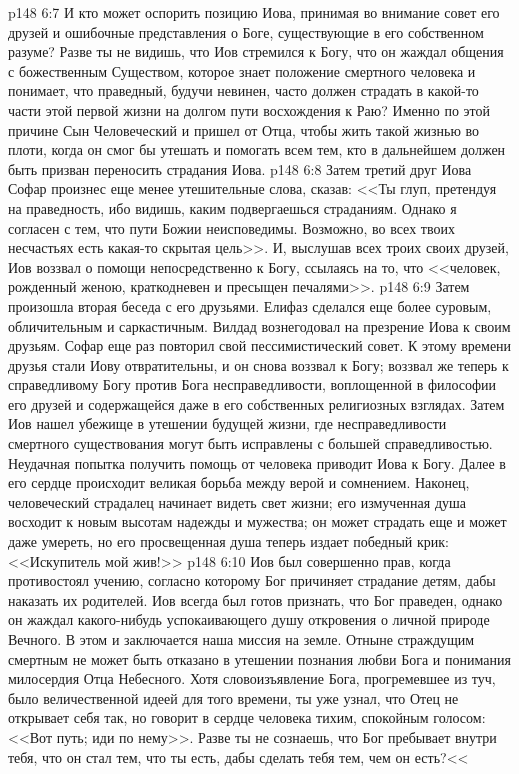 \vs p148 6:7 И кто может оспорить позицию Иова, принимая во внимание совет его друзей и ошибочные представления о Боге, существующие в его собственном разуме? Разве ты не видишь, что Иов стремился к  Богу, что он жаждал общения с божественным Существом, которое знает положение смертного человека и понимает, что праведный, будучи невинен, часто должен страдать в какой\hyp{}то части этой первой жизни на долгом пути восхождения к Раю? Именно по этой причине Сын Человеческий и пришел от Отца, чтобы жить такой жизнью во плоти, когда он смог бы утешать и помогать всем тем, кто в дальнейшем должен быть призван переносить страдания Иова.
\vs p148 6:8 Затем третий друг Иова Софар произнес еще менее утешительные слова, сказав: <<Ты глуп, претендуя на праведность, ибо видишь, каким подвергаешься страданиям. Однако я согласен с тем, что пути Божии неисповедимы. Возможно, во всех твоих несчастьях есть какая\hyp{}то скрытая цель>>. И, выслушав всех троих своих друзей, Иов воззвал о помощи непосредственно к Богу, ссылаясь на то, что <<человек, рожденный женою, краткодневен и пресыщен печалями>>.
\vs p148 6:9 Затем произошла вторая беседа с его друзьями. Елифаз сделался еще более суровым, обличительным и саркастичным. Вилдад вознегодовал на презрение Иова к своим друзьям. Софар еще раз повторил свой пессимистический совет. К этому времени друзья стали Иову отвратительны, и он снова воззвал к Богу; воззвал же теперь к справедливому Богу против Бога несправедливости, воплощенной в философии его друзей и содержащейся даже в его собственных религиозных взглядах. Затем Иов нашел убежище в утешении будущей жизни, где несправедливости смертного существования могут быть исправлены с большей справедливостью. Неудачная попытка получить помощь от человека приводит Иова к Богу. Далее в его сердце происходит великая борьба между верой и сомнением. Наконец, человеческий страдалец начинает видеть свет жизни; его измученная душа восходит к новым высотам надежды и мужества; он может страдать еще и может даже умереть, но его просвещенная душа теперь издает победный крик: <<Искупитель мой жив!>>
\vs p148 6:10 Иов был совершенно прав, когда противостоял учению, согласно которому Бог причиняет страдание детям, дабы наказать их родителей. Иов всегда был готов признать, что Бог праведен, однако он жаждал какого\hyp{}нибудь успокаивающего душу откровения о личной природе Вечного. В этом и заключается наша миссия на земле. Отныне страждущим смертным не может быть отказано в утешении познания любви Бога и понимания милосердия Отца Небесного. Хотя словоизъявление Бога, прогремевшее из туч, было величественной идеей для того времени, ты уже узнал, что Отец не открывает себя так, но говорит в сердце человека тихим, спокойным голосом: <<Вот путь; иди по нему>>. Разве ты не сознаешь, что Бог пребывает внутри тебя, что он стал тем, что ты есть, дабы сделать тебя тем, чем он есть?<<

